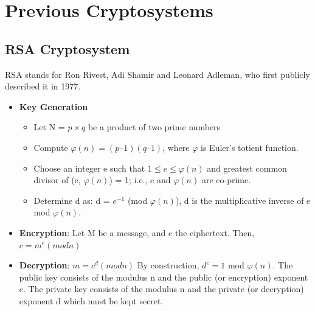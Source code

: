 \documentclass[12pt]{article} %
\begin{document}
\section{Previous Cryptosystems}
\subsection{RSA Cryptosystem}
RSA stands for Ron Rivest, Adi Shamir and Leonard Adleman, who first publicly described it in 1977.

\begin{itemize}
\item{\textbf{Key Generation}}
\begin{itemize}
\item{}Let N = $p\times q$ be a product of two prime numbers
\item{}Compute $\varphi(n) = (p – 1)(q – 1)$, where $\varphi$ is Euler's totient function.
\item{}Choose an integer e such that $1 \leq e \leq \varphi(n)$ and greatest common divisor of (e, $\varphi(n)$) = 1; i.e., e and $\varphi(n)$ are co-prime.
\item{}Determine d as: d = $e^{-1}$ (mod $\varphi(n)$), d is the multiplicative inverse of e mod $\varphi(n)$.
 \end{itemize}

\item{\textbf{Encryption}}:    Let M be a message, and c the ciphertext. Then,
        	$c = m^e (mod n)$
\item{\textbf{Decryption}}:  $m = c^d (mod n)$
By construction, $d^e= 1$ mod $\varphi(n)$. The public key consists of the modulus n and the public (or encryption) exponent e. The private key consists of the modulus n and the private (or decryption) exponent d which must be kept secret.
\end{itemize}
\end{document}
